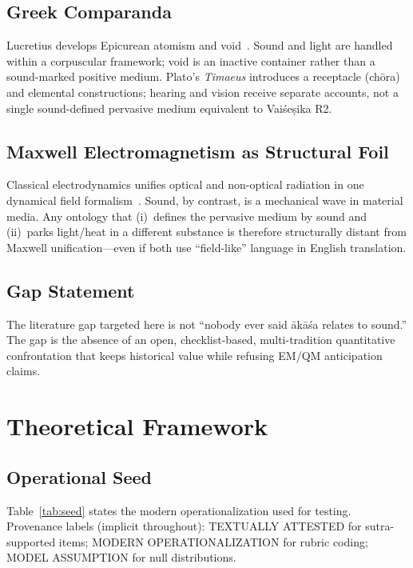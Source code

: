 \documentclass[12pt]{article}
\newcommand{\Vais}{Vaiśeṣika}
\newcommand{\akasa}{ākāśa}
\begin{document}
\subsection{Greek Comparanda}
Lucretius develops Epicurean atomism and void~\citep{lloyd1970}.
Sound and light are handled within a corpuscular framework; void is an inactive container rather than a sound-marked positive medium.
Plato's \emph{Timaeus} introduces a receptacle (chōra) and elemental constructions; hearing and vision receive separate accounts, not a single sound-defined pervasive medium equivalent to \Vais{} R2.

\subsection{Maxwell Electromagnetism as Structural Foil}
Classical electrodynamics unifies optical and non-optical radiation in one dynamical field formalism~\citep{jackson1999}.
Sound, by contrast, is a mechanical wave in material media.
Any ontology that (i)~defines the pervasive medium by sound and (ii)~parks light/heat in a different substance is therefore structurally distant from Maxwell unification---even if both use ``field-like'' language in English translation.

\subsection{Gap Statement}
The literature gap targeted here is not ``nobody ever said \akasa{} relates to sound.''
The gap is the absence of an open, checklist-based, multi-tradition quantitative confrontation that keeps historical value while refusing EM/QM anticipation claims.

\section{Theoretical Framework}

\subsection{Operational Seed}
Table~\ref{tab:seed} states the modern operationalization used for testing.
Provenance labels (implicit throughout): TEXTUALLY ATTESTED for sutra-supported items; MODERN OPERATIONALIZATION for rubric coding; MODEL ASSUMPTION for null distributions.
\end{document}
